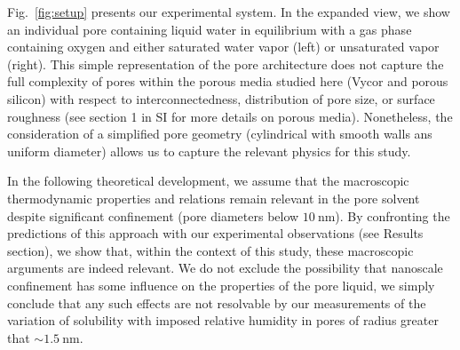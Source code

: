 \documentclass[aps,prl,twocolumn,superscriptaddress,groupedaddress]{revtex4}
\begin{document}
Fig.~\ref{fig:setup} presents our experimental system. In the expanded view, we show an individual pore containing liquid water in equilibrium with a gas phase containing oxygen and either saturated water vapor (left) or unsaturated vapor (right). This simple representation of the pore architecture does not capture the full complexity of pores within the porous media studied here (Vycor and porous silicon) with respect to interconnectedness, distribution of pore size, or surface roughness (see section 1 in SI for more details on porous media). Nonetheless, the consideration of a simplified pore geometry (cylindrical with smooth walls ans uniform diameter) allows us to capture the relevant physics for this study. 

In the following theoretical development, we assume that the macroscopic thermodynamic properties and relations remain relevant in the pore solvent despite significant confinement (pore diameters below $\SI{10}{\nano\meter}$). By confronting the predictions of this approach with our experimental observations (see Results section), we show that, within the context of this study, these macroscopic arguments are indeed relevant. We do not exclude the possibility that nanoscale confinement has some influence on the properties of the pore liquid, we simply conclude that any such effects are not resolvable by our measurements of the variation of solubility with imposed relative humidity in pores of radius greater that $\sim \SI{1.5}{\nano\meter}$.
\end{document}
